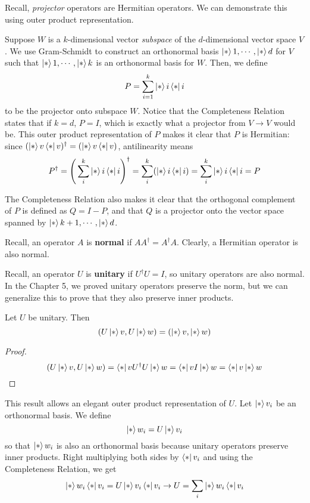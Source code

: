 Recall, \textit{projector} operators are Hermitian operators. We can demonstrate this using outer product representation. 

Suppose $W$  is a $k$-dimensional vector \textit{subspace} of the $d$-dimensional vector space $V$. We use Gram-Schmidt to construct an orthonormal basis $\ket*{1}, \cdots, \ket*{d}$ for $V$ such that $\ket*{1}, \cdots, \ket*{k}$ is an orthonormal basis for $W$. Then, we define 
$$P = \sum_{i=1}^{k} \ket*{i} \bra*{i}$$
to be the projector onto subspace $W$. Notice that the Completeness Relation states that if $k = d$, $P = I$, which is exactly what a projector from $V \rightarrow V$ would be. This outer product representation of $P$ makes it clear that $P$ is Hermitian: since $(\ket*{v} \bra*{v})^{\dagger} = (\ket*{v} \bra*{v})$, antilinearity means
$$P^{\dagger} = \Bigg( \sum_{i}^{k} \ket*{i} \bra*{i} \Bigg)^{\dagger} = \sum_{i}^{k} (\ket*{i} \bra*{i}) = \sum_{i}^{k} \ket*{i} \bra*{i} = P$$

The Completeness Relation also makes it clear that the orthogonal complement of $P$ is defined as $Q = I - P$, and that $Q$ is a projector onto the vector space spanned by $\ket*{k + 1}, \cdots, \ket*{d}$. 

Recall, an operator $A$ is \textbf{normal} if $AA^{\dagger} = A^{\dagger}A$. Clearly, a Hermitian operator is also normal. 

Recall, an operator $U$ is \textbf{unitary} if $U^{\dagger}U = I$, so unitary operators are also normal. In the Chapter 5, we proved unitary operators preserve the norm, but we can generalize this to prove that they also preserve inner products. 

\begin{theorem}
Let $U$ be unitary. Then 
$$(U \ket*{v}, U \ket*{w}) = (\ket*{v}, \ket*{w})$$
\end{theorem}

\begin{proof}
$$ (U \ket*{v}, U \ket*{w}) = \bra*{v} U^{\dagger} U \ket*{w} = \bra*{v} I \ket*{w} = \bra*{v}\ket*{w}$$
\end{proof}

This result allows an elegant outer product representation of $U$. Let $\ket*{v_{i}}$ be an orthonormal basis. We define $$\ket*{w_{i}} = U \ket*{v_{i}}$$ so that $\ket*{w_{i}}$ is also an orthonormal basis because unitary operators preserve inner products. Right multiplying both sides by $\bra*{v_{i}}$ and using the Completeness Relation, we get 
$$\ket*{w_{i}} \bra*{v_{i}} = U \ket*{v_{i}} \bra*{v_{i}} \rightarrow U = \sum_{i} \ket*{w_{i}} \bra*{v_{i}}$$

